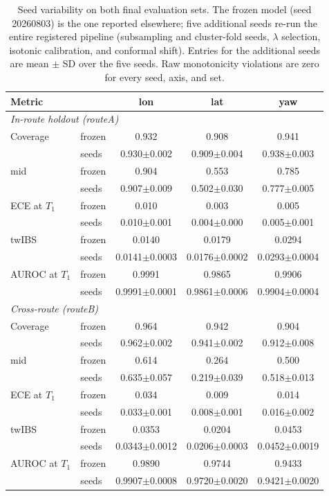 \begin{table}[H]
\caption{Seed variability on both final evaluation sets. The frozen model (seed 20260803) is the one reported elsewhere; five additional seeds re-run the entire registered pipeline (subsampling and cluster-fold seeds, $\lambda$ selection, isotonic calibration, and conformal shift). Entries for the additional seeds are mean $\pm$ SD over the five seeds. Raw monotonicity violations are zero for every seed, axis, and set.}
\label{tab:seeds}
\centering
\footnotesize
\setlength{\tabcolsep}{3pt}
\begin{tabular}{llccc}
\toprule
Metric & & lon & lat & yaw \\
\midrule
\multicolumn{5}{l}{\textit{In-route holdout (routeA)}} \\
Coverage & frozen & 0.932 & 0.908 & 0.941 \\
 & seeds & 0.930$\pm$0.002 & 0.909$\pm$0.004 & 0.938$\pm$0.003 \\
\quad mid & frozen & 0.904 & 0.553 & 0.785 \\
 & seeds & 0.907$\pm$0.009 & 0.502$\pm$0.030 & 0.777$\pm$0.005 \\
ECE at $T_1$ & frozen & 0.010 & 0.003 & 0.005 \\
 & seeds & 0.010$\pm$0.001 & 0.004$\pm$0.000 & 0.005$\pm$0.001 \\
twIBS & frozen & 0.0140 & 0.0179 & 0.0294 \\
 & seeds & 0.0141$\pm$0.0003 & 0.0176$\pm$0.0002 & 0.0293$\pm$0.0004 \\
AUROC at $T_1$ & frozen & 0.9991 & 0.9865 & 0.9906 \\
 & seeds & 0.9991$\pm$0.0001 & 0.9861$\pm$0.0006 & 0.9904$\pm$0.0004 \\
\midrule
\multicolumn{5}{l}{\textit{Cross-route (routeB)}} \\
Coverage & frozen & 0.964 & 0.942 & 0.904 \\
 & seeds & 0.962$\pm$0.002 & 0.941$\pm$0.002 & 0.912$\pm$0.008 \\
\quad mid & frozen & 0.614 & 0.264 & 0.500 \\
 & seeds & 0.635$\pm$0.057 & 0.219$\pm$0.039 & 0.518$\pm$0.013 \\
ECE at $T_1$ & frozen & 0.034 & 0.009 & 0.014 \\
 & seeds & 0.033$\pm$0.001 & 0.008$\pm$0.001 & 0.016$\pm$0.002 \\
twIBS & frozen & 0.0353 & 0.0204 & 0.0453 \\
 & seeds & 0.0343$\pm$0.0012 & 0.0206$\pm$0.0003 & 0.0452$\pm$0.0019 \\
AUROC at $T_1$ & frozen & 0.9890 & 0.9744 & 0.9433 \\
 & seeds & 0.9907$\pm$0.0008 & 0.9720$\pm$0.0020 & 0.9421$\pm$0.0020 \\
\bottomrule
\end{tabular}
\end{table}
